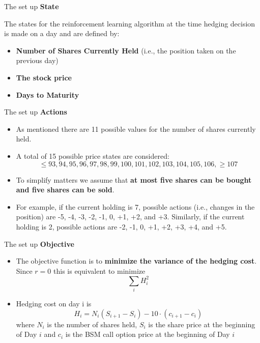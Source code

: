 \documentclass[11pt]{beamer}
\begin{document}
\begin{frame}{The set up }
\textbf{State}\\
\vspace{0.5cm}

The states for the reinforcement learning algorithm at the time hedging decision is made on a day and are defined by:
\begin{itemize}
		\item \textbf{Number of Shares Currently Held} (i.e., the position taken on the previous day)
		\item \textbf{The stock price}
		\item \textbf{Days to Maturity}
	\end{itemize}
\end{frame}
\begin{frame}{The set up }
\textbf{Actions}
	\begin{itemize}
		\item As mentioned there are 11 possible values for the number of shares currently held. 
		\item A total of 15 possible price states are considered:$$\le93, 94, 95, 96, 97, 98, 99, 100, 101, 102, 103, 104, 105, 106, \ge107$$
		\item To simplify matters we assume that \textbf{at most five shares can be bought and five shares can be sold}. 
		\item For example, if the current holding is 7, possible actions (i.e., changes in the position) are -5, -4, -3, -2, -1, 0, +1, +2, and +3. Similarly, if the current holding is 2, possible actions are -2, -1, 0, +1, +2, +3, +4, and +5.
	\end{itemize}
\end{frame}
\begin{frame}{The set up }
\textbf{Objective}
	\begin{itemize}
		\item The objective function is to \textbf{minimize the variance of the hedging cost}. Since $r=0$ this is equivalent to minimize $$\sum\limits_i H_i^2$$
		\item Hedging cost on day i is $$H_i = N_i(S_{i+1}-S_i)-10\cdot (c_{i+1}-c_i)  $$ where $N_i$ is the number of shares held, $S_i$ is the share price      at the beginning of Day $i$ and $c_i$ is the BSM call option price at the beginning of Day $i$
	\end{itemize}
\end{frame}
\end{document}
